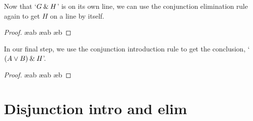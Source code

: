 \noindent Now that `$G\mathbin{\&} H$' is on its own line, we can use the conjunction elimination rule again to get $H$ on a line by itself. 

\begin{proof}
	 \pr{}
	 \ae{ab}
	 \ae{ab}
	 \ae{b}
\end{proof}
In our final step, we use the conjunction introduction rule to get the conclusion, `$(A\vee B)\mathbin{\&} H$'.
\begin{proof}
	 \pr{}
	 \ae{ab}
	 \ae{ab}
	 \ae{b}
	 
\end{proof}
 

\section{Disjunction intro and elim}\label{s:disj-rule}


